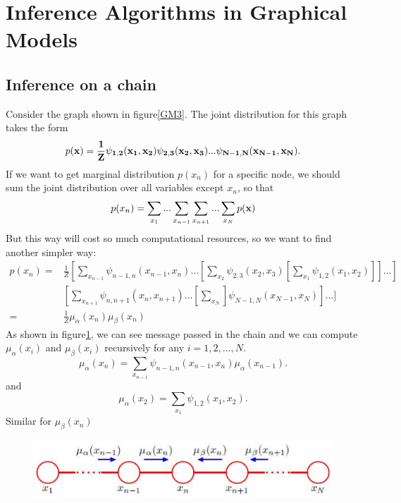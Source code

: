 \documentclass[a4paper]{book}
\begin{document}
\section{Inference Algorithms in Graphical Models}
\subsection{Inference on a chain}
Consider the graph shown in figure\ref{GM3}. The joint distribution for this graph takes the form
\begin{equation}\label{eq8.16}
  p(\bf x) = \frac{1}{Z}\psi_{1,2}(x_1,x_2)\psi_{2,3}(x_2,x_3)...\psi_{N-1,N}(x_{N-1},x_N).
\end{equation}
If we want to get marginal distribution $p(x_n)$ for a specific node, we should sum the joint distribution over all variables except $x_n$, so that
\begin{equation}\label{eq8.17}
  p(x_n) = \sum_{x_1}...\sum_{x_{n-1}}\sum_{x_{n+1}}...\sum_{x_N}p(\bf x)
\end{equation}
But this way will cost so much computational resources, so we want to find another simpler way:
\begin{align}\label{eq8.18}
  p(x_n) =  & \frac{1}{Z}[\sum_{x_{n-1}}\psi_{n-1,n}(x_{n-1},x_n)\dots[\sum_{x_2}\psi_{2,3}(x_2,x_3)[\sum_{x_1}\psi_{1,2}(x_1,x_2)]]\dots] \\
   & [\sum_{x_{n+1}}\psi_{n,n+1}(x_n,x_{n+1})\dots[\sum_{x_N}]\psi_{N-1,N}(x_{N-1},x_{N})]\dots]  \\
   = & \frac{1}{Z}\mu_{\alpha}(x_n)\mu_{\beta}(x_n)
\end{align}
As shown in figure\ref{GM4}, we can see message passed in the chain and we can compute $\mu_{\alpha}(x_i)$ and $\mu_{\beta}(x_i)$ recursively for any $i=1, 2, \dots, N$.
\begin{equation}\label{eq8.19}
  \mu_{\alpha}(x_n) = \sum_{x_{n-1}}\psi_{n-1,n}(x_{n-1},x_n)\mu_{\alpha}(x_{n-1}).
\end{equation}
and
\begin{equation}\label{eq8.20}
  \mu_{\alpha}(x_2) = \sum_{x_1}\psi_{1,2}(x_1,x_2).
\end{equation}
Similar for $\mu_{\beta}(x_n)$
\begin{figure}[bth]
  \centering
  \includegraphics[width=\textwidth]{./imgs/GM4.eps}
  \label{GM4}
\end{figure}
\end{document}
